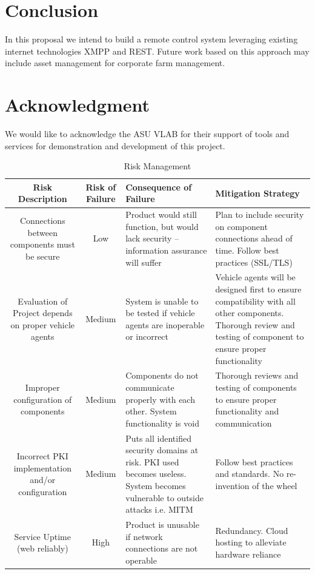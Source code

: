 \documentclass[conference,12pt]{IEEEtran}
\begin{document}
\section{Conclusion}
In this proposal we intend to build a remote control system leveraging existing
internet technologies XMPP and REST. Future work based on this approach may
include asset management for corporate farm management.

\section{Acknowledgment}
We would like to acknowledge the ASU VLAB for their support of tools and
services for demonstration and development of this project.

\printbibliography
\clearpage

\begin{landscape}
\begin{table}%
\caption{Risk Management}
\label{tab:riskmanagement}
\centering
\begin{tabular}{c||c||p{2in}||p{2in}}
\hline
\bfseries Risk Description & \bfseries Risk of Failure & \bfseries Consequence of Failure & \bfseries Mitigation Strategy\\
\hline\hline
Connections between components must be secure
& Low
& Product would still function, but would lack security – information assurance will suffer
& Plan to include security on component connections ahead of time. Follow best practices (SSL/TLS)\\
\hline
Evaluation of Project depends on proper vehicle agents
& Medium
& System is unable to be tested if vehicle agents are inoperable or incorrect
& Vehicle agents will be designed first to ensure compatibility with all other components. Thorough review and testing of component to ensure proper functionality\\
\hline
Improper configuration of components
& Medium
& Components do not communicate properly with each other. System functionality is void
& Thorough reviews and testing of components to ensure proper functionality and communication\\
\hline
Incorrect PKI implementation and/or configuration
& Medium
& Puts all identified security domains at risk. PKI used becomes useless. System becomes vulnerable to outside attacks i.e. MITM
& Follow best practices and standards. No re-invention of the wheel\\
\hline
Service Uptime (web reliably)
& High
& Product is unusable if network connections are not operable
& Redundancy. Cloud hosting to alleviate hardware reliance\\
\hline
\end{tabular}
\end{table}
\end{landscape}
\end{document}
